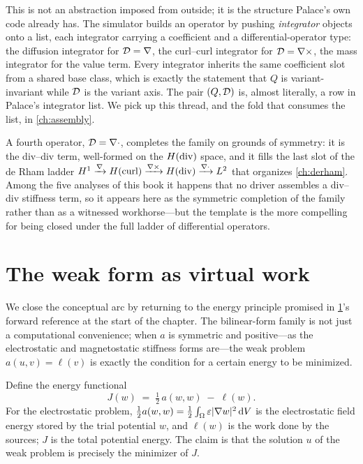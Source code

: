 \begin{remark}
This is not an abstraction imposed from outside; it is the structure Palace's own
code already has. The simulator builds an operator by pushing
\emph{integrator} objects onto a list, each integrator carrying a coefficient and
a differential-operator type: the diffusion integrator for $\mathcal{D}=\nabla$, the
curl--curl integrator for $\mathcal{D}=\nabla\times$, the mass integrator for the value
term. Every integrator inherits the same coefficient slot from a shared base
class, which is exactly the statement that $Q$ is variant-invariant while
$\mathcal{D}$ is the variant axis. The pair $(Q,\mathcal{D})$ is, almost literally, a row
in Palace's integrator list. We pick up this thread, and the fold that consumes
the list, in \cref{ch:assembly}.
\end{remark}

A fourth operator, $\mathcal{D}=\nabla\cdot$, completes the family on grounds of symmetry:
it is the div--div term, well-formed on the $H(\mathrm{div})$ space, and it fills the last
slot of the de Rham ladder $H^1\xrightarrow{\nabla}H(\mathrm{curl})\xrightarrow{\nabla\times}
H(\mathrm{div})\xrightarrow{\nabla\cdot}L^2$ that organizes \cref{ch:derham}. Among the five
analyses of this book it happens that no driver assembles a div--div stiffness
term, so it appears here as the symmetric completion of the family rather than as
a witnessed workhorse---but the template is the more compelling for being closed
under the full ladder of differential operators.

\section{The weak form as virtual work}
\label{sec:virtual-work}

We close the conceptual arc by returning to the energy principle promised in
\cref{sec:virtual-work}'s forward reference at the start of the chapter. The
bilinear-form family is not just a computational convenience; when $a$ is
symmetric and positive---as the electrostatic and magnetostatic stiffness forms
are---the weak problem $a(u,v)=\ell(v)$ is exactly the condition for a certain
energy to be minimized.

Define the energy functional
\begin{equation}
  J(w) \;=\; \tfrac12\,a(w,w) \;-\; \ell(w).
  \label{eq:energy}
\end{equation}
For the electrostatic problem, $\tfrac12 a(w,w)=\tfrac12\int_\Omega
\varepsilon\lvert\nabla w\rvert^2\,\mathrm{d}V$ is the electrostatic field energy stored by the
trial potential $w$, and $\ell(w)$ is the work done by the sources; $J$ is the
total potential energy. The claim is that the solution $u$ of the weak problem is
precisely the minimizer of $J$.

